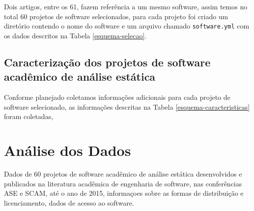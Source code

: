 Dois artigos, entre os 61, fazem referência a um mesmo software, assim temos no
total 60 projetos de software selecionados, para cada projeto foi criado um
diretório contendo o nome do software e um arquivo chamado
\texttt{software.yml} com os dados descritos na Tabela \ref{esquema-selecao}.





\subsection{Caracterização dos projetos de software acadêmico de análise estática} %

Conforme planejado coletamos informações adicionais para cada projeto de
software selecionado, as informações descritas na Tabela
\ref{esquema-caracteristicas} foram coletadas,





\section{Análise dos Dados} \label{estudo1:analise}

Dados de 60 projetos de software acadêmico de análise estática desenvolvidos e
publicados na literatura acadêmica de engenharia de software, nas conferências
ASE e SCAM, até o ano de 2015, informaçoes sobre as formas de distribuição e
licenciamento, dados de acesso ao software.

